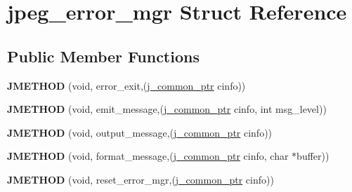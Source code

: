 \hypertarget{structjpeg__error__mgr}{}\section{jpeg\+\_\+error\+\_\+mgr Struct Reference}
\label{structjpeg__error__mgr}
\subsection*{Public Member Functions}
\begin{DoxyCompactItemize}
\item 
\mbox{\label{structjpeg__error__mgr_a0c05a9190ca968926282812fa0e5bdfe}} 
{\bfseries J\+M\+E\+T\+H\+OD} (void, error\+\_\+exit,(\hyperlink{structjpeg__common__struct}{j\+\_\+common\+\_\+ptr} cinfo))
\item 
\mbox{\label{structjpeg__error__mgr_a50af831b472f19f50782e113652db477}} 
{\bfseries J\+M\+E\+T\+H\+OD} (void, emit\+\_\+message,(\hyperlink{structjpeg__common__struct}{j\+\_\+common\+\_\+ptr} cinfo, int msg\+\_\+level))
\item 
\mbox{\label{structjpeg__error__mgr_aa8271bf787f32d4605f5fa84793e6c81}} 
{\bfseries J\+M\+E\+T\+H\+OD} (void, output\+\_\+message,(\hyperlink{structjpeg__common__struct}{j\+\_\+common\+\_\+ptr} cinfo))
\item 
\mbox{\label{structjpeg__error__mgr_adb6450d2eddd917ba14ae0a58d439061}} 
{\bfseries J\+M\+E\+T\+H\+OD} (void, format\+\_\+message,(\hyperlink{structjpeg__common__struct}{j\+\_\+common\+\_\+ptr} cinfo, char $\ast$buffer))
\item 
\mbox{\label{structjpeg__error__mgr_a7eb28e10bfc179c1d09becadd9446cf0}} 
{\bfseries J\+M\+E\+T\+H\+OD} (void, reset\+\_\+error\+\_\+mgr,(\hyperlink{structjpeg__common__struct}{j\+\_\+common\+\_\+ptr} cinfo))
\end{DoxyCompactItemize}
